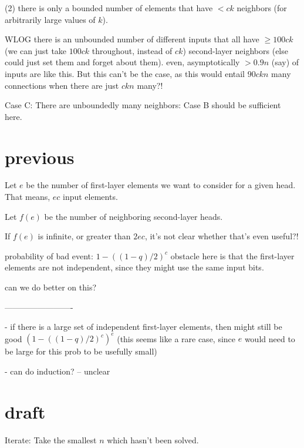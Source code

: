 \documentclass[11pt,a4paper]{article}
\begin{document}
(2) there is only a bounded number of elements that have $< ck$ neighbors (for arbitrarily large values of $k$). 

WLOG there is an unbounded number of different inputs that all have $\geq 100ck$ (we can just take $100ck$ throughout, instead of $ck$) second-layer neighbors (else could just set them and forget about them). even, asymptotically $>0.9n$ (say) of inputs are like this. But this can't be the case, as this would entail $90ckn$ many connections when there are just $ckn$ many?!


Case C: There are unboundedly many neighbors: Case B should be sufficient here.



\section{previous}



Let $e$ be the number of first-layer elements we want to consider for a given head.
That means, $ec$ input elements.

Let $f(e)$ be the number of neighboring second-layer heads. 

If $f(e)$ is infinite, or greater than $2ec$, it's not clear whether that's even useful?!

probability of bad event:
$1-((1-q)/2)^{c}$
obstacle here is that the first-layer elements are not independent, since they might use the same input bits.

can we do better on this?


-------------------------

- if there is a large set of independent first-layer elements, then might still be good $(1-((1-q)/2)^{c})^{e}$ (this seems like a rare case, since $e$ would need to be large for this prob to be usefully small)

- can do induction? -- unclear


\section{draft}

Iterate:
Take the smallest $n$ which hasn't been solved.
\end{document}
